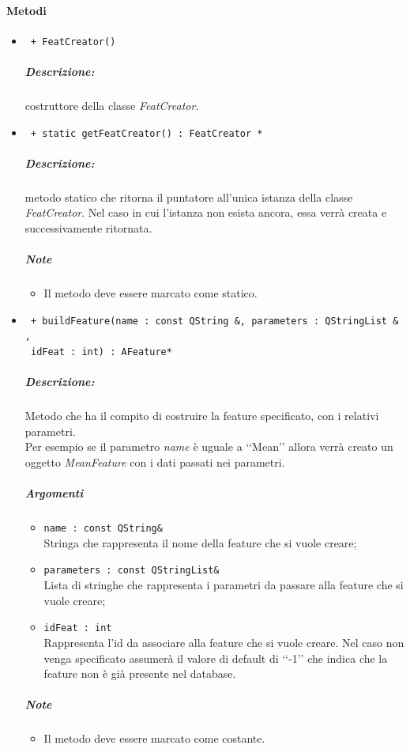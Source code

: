 \paragraph{Metodi}
	\begin{itemize}
		\item \color{blue}\verb! + FeatCreator() !\\
		\color{black}
		\subparagraph{Descrizione:} costruttore della classe \textsl{FeatCreator}.
		
		
		\item \color{blue}\verb! + static getFeatCreator() : FeatCreator *!\\
		\color{black}
		\subparagraph{Descrizione:} metodo statico che  ritorna il puntatore all'unica istanza della classe \textsl{FeatCreator}. Nel caso in cui l'istanza non esista ancora, essa verrà creata e successivamente ritornata.
		\subparagraph{Note}
			\begin{itemize}
				\item Il metodo deve essere marcato come statico.
			\end{itemize}
			
		\item \color{blue}\verb! + buildFeature(name : const QString &, parameters : QStringList & ,!\\
				 					\verb! idFeat : int) : AFeature* !\\
		\color{black}
		\subparagraph{Descrizione:}Metodo che ha il compito di costruire la feature\g{} specificato, con i relativi parametri.\\
		Per esempio se il parametro \textit{name} è uguale a \lq\lq{}Mean\rq\rq{} allora verrà creato un oggetto \textit{MeanFeature} con i dati passati nei parametri.
		\subparagraph{Argomenti}
			\begin{itemize}
						\item \color{RoyalPurple}\verb!name : const QString&!\\
						\color{black}Stringa che rappresenta il nome della feature\g{} che si vuole creare;
						
						\item \color{RoyalPurple}\verb!parameters : const QStringList&!\\
						\color{black}Lista di stringhe che rappresenta i parametri da passare alla feature\g{} che si vuole creare;
						
						\item \color{RoyalPurple}\verb!idFeat : int!\\
						\color{black}Rappresenta l'id da associare alla feature\g{} che si vuole creare. Nel caso non venga specificato assumerà il valore di default di \lq\lq{}-1\rq\rq{} che indica che la feature\g{} non è già presente nel database.
					\end{itemize}
		\subparagraph{Note}
			\begin{itemize}
				\item Il metodo deve essere marcato come costante.
			\end{itemize}
	

\end{itemize}
